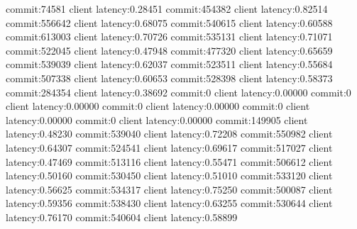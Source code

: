 commit:74581 client latency:0.28451
commit:454382 client latency:0.82514
commit:556642 client latency:0.68075
commit:540615 client latency:0.60588
commit:613003 client latency:0.70726
commit:535131 client latency:0.71071
commit:522045 client latency:0.47948
commit:477320 client latency:0.65659
commit:539039 client latency:0.62037
commit:523511 client latency:0.55684
commit:507338 client latency:0.60653
commit:528398 client latency:0.58373
commit:284354 client latency:0.38692
commit:0 client latency:0.00000
commit:0 client latency:0.00000
commit:0 client latency:0.00000
commit:0 client latency:0.00000
commit:0 client latency:0.00000
commit:149905 client latency:0.48230
commit:539040 client latency:0.72208
commit:550982 client latency:0.64307
commit:524541 client latency:0.69617
commit:517027 client latency:0.47469
commit:513116 client latency:0.55471
commit:506612 client latency:0.50160
commit:530450 client latency:0.51010
commit:533120 client latency:0.56625
commit:534317 client latency:0.75250
commit:500087 client latency:0.59356
commit:538430 client latency:0.63255
commit:530644 client latency:0.76170
commit:540604 client latency:0.58899